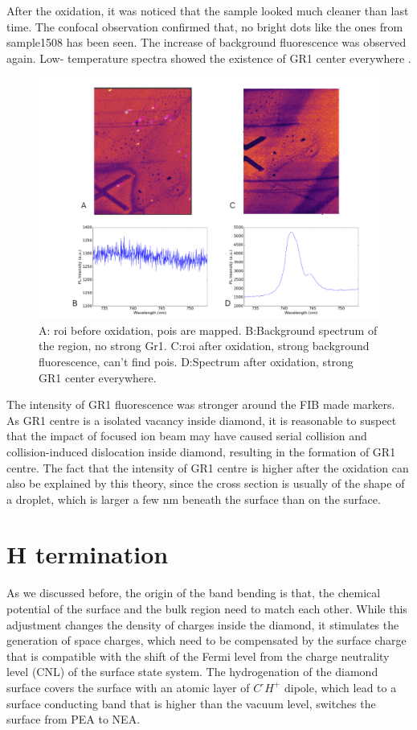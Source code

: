 After the oxidation, it was noticed that the sample looked much cleaner than last time. The confocal observation confirmed that, no bright dots like the ones from sample1508 has been seen. The increase of background fluorescence was observed again. Low- temperature spectra showed the existence of GR1 center everywhere \cite{jelezko_single_2006}.

\begin{figure}[h]
\centering
\includegraphics[width=0.7\linewidth]{Figures/pic/afteroxidation2}
\caption{A: roi before oxidation, pois are mapped. B:Background spectrum of the region, no strong Gr1. C:roi after oxidation, strong background fluorescence, can't find pois. D:Spectrum after oxidation, strong GR1 center everywhere.}
\label{fig:wp20160921204221proli}
\end{figure}

The intensity of GR1 fluorescence was stronger around the FIB made markers. As GR1 centre is a isolated vacancy inside diamond, it is reasonable to suspect that the impact of focused ion beam may have caused serial collision and collision-induced dislocation inside diamond, resulting in the formation of GR1 centre. The fact that the intensity of GR1 centre is higher after the oxidation can also be explained by this theory, since the cross section is usually of the shape of a droplet, which is larger a few nm beneath the surface than on the surface.


\section[H termination]{H termination}
As we discussed before, the origin of the band bending is that, the chemical potential of the surface and the bulk region need to match each other. While this adjustment changes the density of charges inside the diamond, it stimulates the generation of space charges, which need to be compensated by the surface charge that is compatible with the shift of the Fermi level from the charge neutrality level (CNL) of the surface state system. The hydrogenation of the diamond surface covers the surface with an atomic layer of $C^{\text{-}} H^{+}$ dipole, which lead to a surface conducting band that is higher than the vacuum level, switches the surface from PEA to NEA. 

